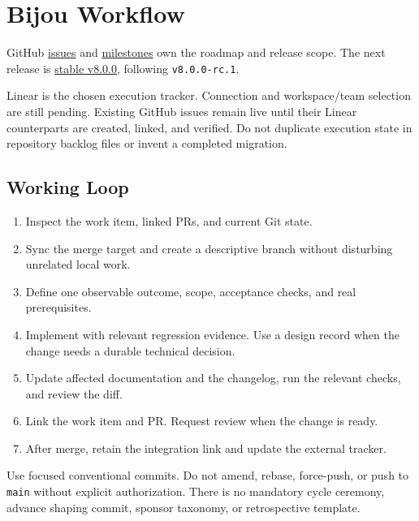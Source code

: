 \chapter{Bijou Workflow}\label{record-013}

\smallskip

GitHub \href{https://github.com/flyingrobots/bijou/issues}{issues} and \href{https://github.com/flyingrobots/bijou/milestones}{milestones} own the roadmap and release scope. The next release is \href{https://github.com/flyingrobots/bijou/milestone/6}{stable v8.0.0}, following \texttt{v\allowbreak{}8\allowbreak{}.\allowbreak{}0\allowbreak{}.\allowbreak{}0\allowbreak{}-\allowbreak{}r\allowbreak{}c\allowbreak{}.\allowbreak{}1}.

Linear is the chosen execution tracker. Connection and workspace/team selection are still pending. Existing GitHub issues remain live until their Linear counterparts are created, linked, and verified. Do not duplicate execution state in repository backlog files or invent a completed migration.

\section{Working Loop}\label{record-013-working-loop}

\begin{enumerate}
\def\labelenumi{\arabic{enumi}.}
\tightlist
\item
  Inspect the work item, linked PRs, and current Git state.
\item
  Sync the merge target and create a descriptive branch without disturbing unrelated local work.
\item
  Define one observable outcome, scope, acceptance checks, and real prerequisites.
\item
  Implement with relevant regression evidence. Use a design record when the change needs a durable technical decision.
\item
  Update affected documentation and the changelog, run the relevant checks, and review the diff.
\item
  Link the work item and PR. Request review when the change is ready.
\item
  After merge, retain the integration link and update the external tracker.
\end{enumerate}

Use focused conventional commits. Do not amend, rebase, force-push, or push to \texttt{m\allowbreak{}a\allowbreak{}i\allowbreak{}n} without explicit authorization. There is no mandatory cycle ceremony, advance shaping commit, sponsor taxonomy, or retrospective template.


